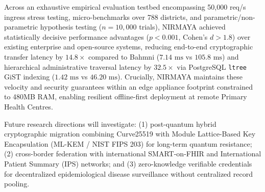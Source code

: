 \documentclass[journal,twocolumn]{IEEEtran}
\begin{document}
Across an exhaustive empirical evaluation testbed encompassing 50,000 req/s ingress stress testing, micro-benchmarks over 788 districts, and parametric/non-parametric hypothesis testing ($n = 10,000$ trials), NIRMAYA achieved statistically decisive performance advantages ($p < 0.001$, Cohen's $d > 1.8$) over existing enterprise and open-source systems, reducing end-to-end cryptographic transfer latency by $14.8\times$ compared to Bahmni ($7.14\text{ ms}$ vs $105.8\text{ ms}$) and hierarchical administrative traversal latency by $32.5\times$ via PostgreSQL \texttt{ltree} GiST indexing ($1.42\text{ ms}$ vs $46.20\text{ ms}$). Crucially, NIRMAYA maintains these velocity and security guarantees within an edge appliance footprint constrained to 480MB RAM, enabling resilient offline-first deployment at remote Primary Health Centres.

Future research directions will investigate: (1) post-quantum hybrid cryptographic migration combining Curve25519 with Module Lattice-Based Key Encapsulation (ML-KEM / NIST FIPS 203) for long-term quantum resistance; (2) cross-border federation with international SMART-on-FHIR and International Patient Summary (IPS) networks; and (3) zero-knowledge verifiable credentials for decentralized epidemiological disease surveillance without centralized record pooling.



\end{document}

